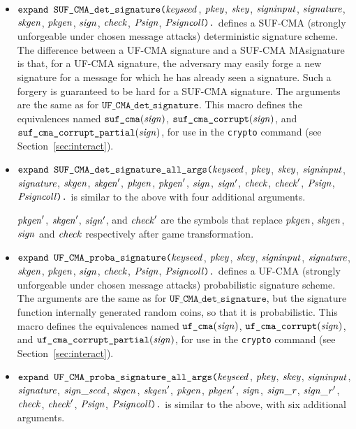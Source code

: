 \documentclass{article}
\begin{document}
\begin{itemize}
\item $\texttt{expand SUF\_CMA\_det\_signature(}\mathit{keyseed}$, $\mathit{pkey}$, $\mathit{skey}$,
$  \mathit{signinput}$, $\mathit{signature}$, $\mathit{skgen}$, $\mathit{pkgen}$, $\mathit{sign}$, $
  \mathit{check}$, $\mathit{Psign}$, $\mathit{Psigncoll}\texttt{).}$ defines a
  SUF-CMA (strongly unforgeable under chosen message attacks)
  deterministic signature scheme.
  The difference between a UF-CMA signature and a SUF-CMA MAsignature
  is that, for a UF-CMA signature, the adversary may easily forge a
  new signature for a message for which he has already seen a
  signature. Such a forgery is guaranteed to be hard for a SUF-CMA
  signature. The arguments are the same as for $\texttt{UF\_CMA\_det\_signature}$.
   This macro defines the equivalences named
   $\texttt{suf\_cma}(\mathit{sign})$,
   $\texttt{suf\_cma\_corrupt}(\mathit{sign})$, and
   $\texttt{suf\_cma\_corrupt\_partial}(\mathit{sign})$, for use in the
   \texttt{crypto} command (see Section~\ref{sec:interact}).

\item $\texttt{expand SUF\_CMA\_det\_signature\_all\_args(}\mathit{keyseed}$, $\mathit{pkey}$, $\mathit{skey}$,
$  \mathit{signinput}$, $\mathit{signature}$, $\mathit{skgen}$, $\mathit{skgen}'$, $\mathit{pkgen}$, $\mathit{pkgen}'$, $\mathit{sign}$, $\mathit{sign}'$, $\mathit{check}$, $\mathit{check}'$, $\mathit{Psign}$, $\mathit{Psigncoll}\texttt{).}$ is similar to the above with four additional arguments.

  $\mathit{pkgen}'$, $\mathit{skgen}'$, $\mathit{sign}'$, and $\mathit{check}'$ are the symbols that replace $\mathit{pkgen}$, $\mathit{skgen}$, $\mathit{sign}$ and $\mathit{check}$ respectively after game transformation.

\item $\texttt{expand UF\_CMA\_proba\_signature(}\mathit{keyseed}$, $\mathit{pkey}$, $\mathit{skey}$,
$  \mathit{signinput}$, $\mathit{signature}$, $\mathit{skgen}$, $\mathit{pkgen}$, $\mathit{sign}$, $
  \mathit{check}$, $\mathit{Psign}$, $\mathit{Psigncoll}\texttt{).}$ defines a
  UF-CMA (strongly unforgeable under chosen message attacks)
  probabilistic signature scheme.
  The arguments are the same as for $\texttt{UF\_CMA\_det\_signature}$,
  but the signature function internally generated random coins,
  so that it is probabilistic.
   This macro defines the equivalences named
   $\texttt{uf\_cma}(\mathit{sign})$,
   $\texttt{uf\_cma\_corrupt}(\mathit{sign})$, and
   $\texttt{uf\_cma\_corrupt\_partial}(\mathit{sign})$, for use in the
   \texttt{crypto} command (see Section~\ref{sec:interact}).

\item $\texttt{expand UF\_CMA\_proba\_signature\_all\_args(}\mathit{keyseed}$, $\mathit{pkey}$, $\mathit{skey}$,
$  \mathit{signinput}$, $\mathit{signature}$, $\mathit{sign\_seed}$, $\mathit{skgen}$, $\mathit{skgen}'$, $\mathit{pkgen}$, $\mathit{pkgen}'$, $\mathit{sign}$, $\mathit{sign\_r}$, $\mathit{sign\_r}'$, $\mathit{check}$, $\mathit{check}'$, $\mathit{Psign}$, $\mathit{Psigncoll}\texttt{).}$ is similar to the above,
  with six additional arguments. 


\end{itemize}
\end{document}
